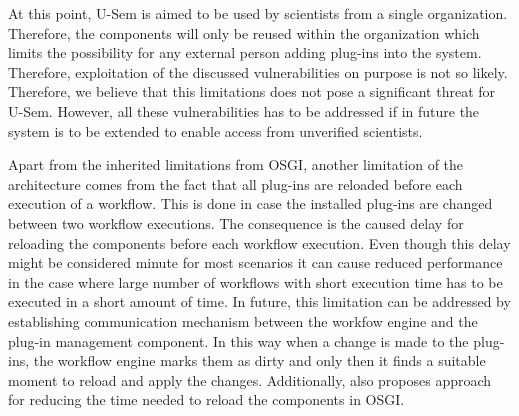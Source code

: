 At this point, U-Sem is aimed to be used by scientists from a single organization. Therefore, the components will only be reused within the organization which limits the possibility for any external person adding plug-ins into the system. Therefore, exploitation of the discussed vulnerabilities on purpose is not so likely. Therefore, we believe that this limitations does not pose a significant threat for U-Sem. However, all these vulnerabilities has to be addressed if in future the system is to be extended to enable access from unverified scientists. 

Apart from the inherited limitations from OSGI, another limitation of the architecture comes from the fact that all plug-ins are reloaded before each execution of a workflow. This is done in case the installed plug-ins are changed between two workflow executions. The consequence is the caused delay for reloading the components before each workflow execution. Even though this delay might be considered minute for most scenarios it can cause reduced performance in the case where large number of workflows with short execution time has to be executed in a short amount of time. In future, this limitation can be addressed by establishing communication mechanism between the workfow engine and the plug-in management component. In this way when a change is made to the plug-ins, the workflow engine marks them as dirty and only then it finds a suitable moment to reload and apply the changes. Additionally, \cite{Nikolov} also proposes approach for reducing the time needed to reload the components in OSGI.

